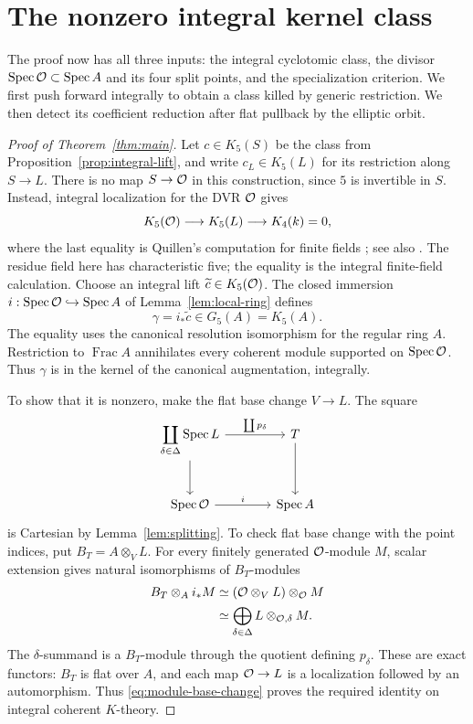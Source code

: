 \section{The nonzero integral kernel class}
\label{sec:main-proof}

The proof now has all three inputs: the integral cyclotomic class,
the divisor $\operatorname{Spec}\mathcal O\subset\operatorname{Spec} A$ and its four split points, and
the specialization criterion. We first push forward integrally to
obtain a class killed by generic restriction. We then detect its
coefficient reduction after flat pullback by the elliptic orbit.

\begin{proof}[Proof of Theorem~\ref{thm:main}]
Let $c\in K_5(S)$ be the class from Proposition~\ref{prop:integral-lift},
and write $c_L\in K_5(L)$ for its restriction along $S\to L$.
There is no map $S\to\mathcal O$ in this construction, since $5$ is invertible
in $S$. Instead, integral localization for
the DVR $\mathcal O$ gives
\[
 K_5(\mathcal O)\longrightarrow K_5(L)\longrightarrow K_4(k)=0,
\]
where the last equality is Quillen's computation for finite fields
\cite{Quillen1972FiniteFields}; see also \cite[IV.1.13]{Weibel2013}.
The residue field here has characteristic five; the equality is the
integral finite-field calculation. Choose an integral lift
$\widetilde c\in K_5(\mathcal O)$. The closed immersion
$i:\operatorname{Spec}\mathcal O\hookrightarrow\operatorname{Spec} A$ of Lemma~\ref{lem:local-ring} defines
\[
 \gamma=i_*\widetilde c\in G_5(A)=K_5(A).
\]
The equality uses the canonical resolution isomorphism for the regular
ring $A$. Restriction to $\operatorname{Frac}A$ annihilates every coherent
module supported on $\operatorname{Spec}\mathcal O$. Thus $\gamma$ is in the kernel of the
canonical augmentation, integrally.

To show that it is nonzero, make the flat base change $V\to L$. The square
\[
\begin{tikzcd}[column sep=large,row sep=large]
 \displaystyle\coprod_{\delta\in\Delta}\Spec L
       \arrow[r,"\coprod p_\delta"] \arrow[d]
       & T \arrow[d] \\
 \Spec\OO \arrow[r,"i"] & \Spec A
\end{tikzcd}
\]
is Cartesian by Lemma~\ref{lem:splitting}. To check flat base change with the point indices, put $B_T=A\otimes_VL$.
For every finitely generated $\mathcal O$-module $M$, scalar extension gives
natural isomorphisms of $B_T$-modules
\begin{equation}\label{eq:module-base-change}
 \begin{aligned}
 B_T\otimes_A i_*M
 &\simeq(\mathcal O\otimes_VL)\otimes_{\mathcal O}M\\
 &\simeq\bigoplus_{\delta\in\Delta}L\otimes_{\mathcal O,\delta}M.
 \end{aligned}
\end{equation}
The $\delta$-summand is a $B_T$-module through the quotient defining
$p_\delta$. These are exact functors: $B_T$ is flat over $A$, and
each map $\mathcal O\to L$ is a localization followed by an automorphism.
Thus \eqref{eq:module-base-change} proves the required identity on
integral coherent $K$-theory.


\end{proof}
